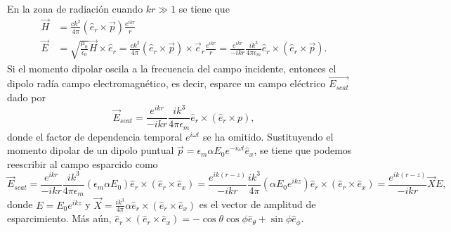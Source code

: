 \documentclass[paper=letter, fontsize=12pt,]{article}
\begin{document}
\noindent En la zona de radiación cuando $kr\gg 1$ se tiene que
\begin{align}
    \Vec{H}&=\frac{ck^2}{4\pi}(\hat{e}_r\times\Vec{p})\frac{e^{ikr}}{r}\\
    \Vec{E}&=\sqrt{\frac{\mu_0}{\epsilon_0}}\Vec{H}\times\hat{e}_r=\frac{ck^2}{4\pi}(\hat{e}_r\times\Vec{p})\times\Vec{e}_r\frac{e^{ikr}}{r}=\frac{e^{ikr}}{-ikr}\frac{ik^3}{4\pi\epsilon_m}\hat{e}_r\times(\hat{e}_r\times\Vec{p}).
\end{align}
Si el momento dipolar oscila a la frecuencia del campo incidente, entonces el dipolo radía campo electromagnético, es decir, esparce un campo eléctrico $\Vec{E_{scat}}$ dado por
\begin{equation}
    \Vec{E}_{scat}=\frac{e^{ikr}}{-ikr}\frac{ik^3}{4\pi\epsilon_m}\hat{e}_r\times(\hat{e}_r\times p)  ,  
\end{equation}
donde el factor de dependencia temporal $e^{i\omega t}$ se ha omitido. Sustituyendo el momento dipolar de un dipolo puntual $\Vec{p}=\epsilon_m \alpha E_0 e^{-i\omega t}\hat{e}_x$, se tiene que podemos reescribir al campo esparcido como
$$\Vec{E}_{scat}=\frac{e^{ikr}}{-ikr}\frac{ik^3}{4\pi\epsilon_m}\left(\epsilon_m \alpha E_0 \right)\hat{e}_r\times(\hat{e}_r\times \hat{e}_x)=\frac{e^{ik(r-z)}}{-ikr}\frac{ik^3}{4\pi}\left( \alpha E_0 e^{ikz}\right)\hat{e}_r\times(\hat{e}_r\times \hat{e}_x)=\frac{e^{ik(r-z)}}{-ikr}\Vec{X}E,$$
donde $E=E_0 e^{ikz}$ y $\Vec{X}=\frac{ik^3}{4\pi}\alpha \hat{e}_r\times(\hat{e}_r\times \hat{e}_x)$ es
el vector de amplitud de esparcimiento. Más aún, $\hat{e}_r\times(\hat{e}_r\times \hat{e}_x)=-\cos\theta\cos\phi \hat{e}_{\theta}+\sin\phi \hat{e}_{\phi}$. \\
\end{document}
